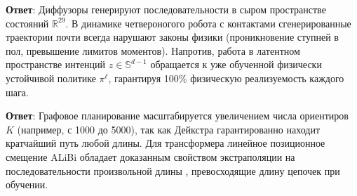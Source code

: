 \begin{interviewbox}
\textbf{Ответ}: Диффузоры генерируют последовательности в сыром пространстве состояний $\mathbb{R}^{29}$. В динамике четвероногого робота с контактами сгенерированные траектории почти всегда нарушают законы физики (проникновение ступней в пол, превышение лимитов моментов). Напротив, работа в латентном пространстве интенций $z \in \mathbb{S}^{d-1}$ обращается к уже обученной физически устойчивой политике $\pi^\ell$, гарантируя 100\% физическую реализуемость каждого шага.
\end{interviewbox}

\begin{interviewbox}
\textbf{Ответ}: Графовое планирование масштабируется увеличением числа ориентиров $K$ (например, с 1000 до 5000), так как Дейкстра гарантированно находит кратчайший путь любой длины. Для трансформера линейное позиционное смещение ALiBi обладает доказанным свойством экстраполяции на последовательности произвольной длины \cite{press2021train}, превосходящие длину цепочек при обучении.
\end{interviewbox}
